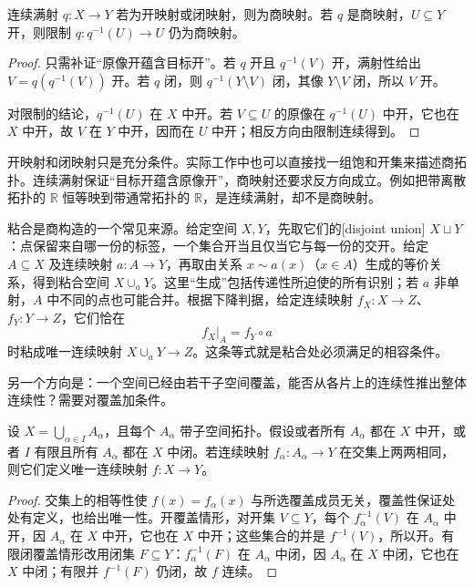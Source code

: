 \begin{proposition}\label{g1:prop:quotient-tests}
	连续满射 \(q:X\to Y\) 若为开映射或闭映射，则为商映射。若 \(q\) 是商映射，\(U\subseteq Y\) 开，则限制 \(q:q^{-1}(U)\to U\) 仍为商映射。
\end{proposition}
\begin{proof}
	只需补证“原像开蕴含目标开”。若 \(q\) 开且 \(q^{-1}(V)\) 开，满射性给出 \(V=q(q^{-1}(V))\) 开。若 \(q\) 闭，则 \(q^{-1}(Y\setminus V)\) 闭，其像 \(Y\setminus V\) 闭，所以 \(V\) 开。

	对限制的结论，\(q^{-1}(U)\) 在 \(X\) 中开。若 \(V\subseteq U\) 的原像在 \(q^{-1}(U)\) 中开，它也在 \(X\) 中开，故 \(V\) 在 \(Y\) 中开，因而在 \(U\) 中开；相反方向由限制连续得到。
\end{proof}

开映射和闭映射只是充分条件。实际工作中也可以直接找一组饱和开集来描述商拓扑。连续满射保证“目标开蕴含原像开”，商映射还要求反方向成立。例如把带离散拓扑的 \(\mathbb R\) 恒等映到带通常拓扑的 \(\mathbb R\)，是连续满射，却不是商映射。

粘合是商构造的一个常见来源。给定空间 \(X,Y\)，先取它们的[disjoint union] \(X\sqcup Y\)：点保留来自哪一份的标签，一个集合开当且仅当它与每一份的交开。给定 \(A\subseteq X\) 及连续映射 \(a:A\to Y\)，再取由关系 \(x\sim a(x)\)（\(x\in A\)）生成的等价关系，得到粘合空间 \(X\cup_aY\)。这里“生成”包括传递性所迫使的所有识别；若 \(a\) 非单射，\(A\) 中不同的点也可能合并。根据下降判据，给定连续映射 \(f_X:X\to Z\)、\(f_Y:Y\to Z\)，它们恰在
\[
	f_X|_A=f_Y\circ a
\]
时粘成唯一连续映射 \(X\cup_aY\to Z\)。这条等式就是粘合处必须满足的相容条件。

另一个方向是：一个空间已经由若干子空间覆盖，能否从各片上的连续性推出整体连续性？需要对覆盖加条件。

\begin{proposition}\label{g1:prop:gluing-lemma}
	设 \(X=\bigcup_{\alpha\in I}A_\alpha\)，且每个 \(A_\alpha\) 带子空间拓扑。假设或者所有 \(A_\alpha\) 都在 \(X\) 中开，或者 \(I\) 有限且所有 \(A_\alpha\) 都在 \(X\) 中闭。若连续映射 \(f_\alpha:A_\alpha\to Y\) 在交集上两两相同，则它们定义唯一连续映射 \(f:X\to Y\)。
\end{proposition}
\begin{proof}
	交集上的相等性使 \(f(x)=f_\alpha(x)\) 与所选覆盖成员无关，覆盖性保证处处有定义，也给出唯一性。开覆盖情形，对开集 \(V\subseteq Y\)，每个 \(f_\alpha^{-1}(V)\) 在 \(A_\alpha\) 中开，因 \(A_\alpha\) 在 \(X\) 中开，它也在 \(X\) 中开；这些集合的并是 \(f^{-1}(V)\)，所以开。有限闭覆盖情形改用闭集 \(F\subseteq Y\)：\(f_\alpha^{-1}(F)\) 在 \(A_\alpha\) 中闭，因 \(A_\alpha\) 在 \(X\) 中闭，它也在 \(X\) 中闭；有限并 \(f^{-1}(F)\) 仍闭，故 \(f\) 连续。
\end{proof}

